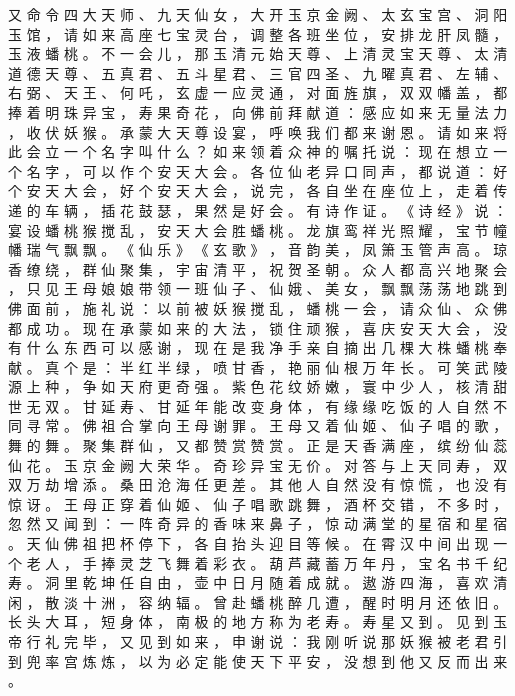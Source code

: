 {又 命 令 四 大 天 师 、 九 天 仙 女 ， 大 开 玉 京 金 阙 、 太 玄 宝 宫 、 洞 阳 玉 馆 ， 请 如 来 高 座 七 宝 灵 台 ， 调 整 各 班 坐 位 ， 安 排 龙 肝 凤 髓 ， 玉 液 蟠 桃 。
不 一 会 儿 ， 那 玉 清 元 始 天 尊 、 上 清 灵 宝 天 尊 、 太 清 道 德 天 尊 、 五 真 君 、 五 斗 星 君 、 三 官 四 圣 、 九 曜 真 君 、 左 辅 、 右 弼 、 天 王 、 何 吒 ， 玄 虚 一 应 灵 通 ， 对 面 旌 旗 ， 双 双 幡 盖 ， 都 捧 着 明 珠 异 宝 ， 寿 果 奇 花 ， 向 佛 前 拜 献 道 ： 感 应 如 来 无 量 法 力 ， 收 伏 妖 猴 。
承 蒙 大 天 尊 设 宴 ， 呼 唤 我 们 都 来 谢 恩 。
请 如 来 将 此 会 立 一 个 名 字 叫 什 么 ？ 如 来 领 着 众 神 的 嘱 托 说 ： 现 在 想 立 一 个 名 字 ， 可 以 作 个 安 天 大 会 。
各 位 仙 老 异 口 同 声 ， 都 说 道 ： 好 个 安 天 大 会 ， 好 个 安 天 大 会 ， 说 完 ， 各 自 坐 在 座 位 上 ， 走 着 传 递 的 车 辆 ， 插 花 鼓 瑟 ， 果 然 是 好 会 。
有 诗 作 证 。
《 诗 经 》 说 ： 宴 设 蟠 桃 猴 搅 乱 ， 安 天 大 会 胜 蟠 桃 。
龙 旗 鸾 祥 光 照 耀 ， 宝 节 幢 幡 瑞 气 飘 飘 。
《 仙 乐 》 《 玄 歌 》 ， 音 韵 美 ， 凤 箫 玉 管 声 高 。
琼 香 缭 绕 ， 群 仙 聚 集 ， 宇 宙 清 平 ， 祝 贺 圣 朝 。
众 人 都 高 兴 地 聚 会 ， 只 见 王 母 娘 娘 带 领 一 班 仙 子 、 仙 娥 、 美 女 ， 飘 飘 荡 荡 地 跳 到 佛 面 前 ， 施 礼 说 ： 以 前 被 妖 猴 搅 乱 ， 蟠 桃 一 会 ， 请 众 仙 、 众 佛 都 成 功 。
现 在 承 蒙 如 来 的 大 法 ， 锁 住 顽 猴 ， 喜 庆 安 天 大 会 ， 没 有 什 么 东 西 可 以 感 谢 ， 现 在 是 我 净 手 亲 自 摘 出 几 棵 大 株 蟠 桃 奉 献 。
真 个 是 ： 半 红 半 绿 ， 喷 甘 香 ， 艳 丽 仙 根 万 年 长 。
可 笑 武 陵 源 上 种 ， 争 如 天 府 更 奇 强 。
紫 色 花 纹 娇 嫩 ， 寰 中 少 人 ， 核 清 甜 世 无 双 。
甘 延 寿 、 甘 延 年 能 改 变 身 体 ， 有 缘 缘 吃 饭 的 人 自 然 不 同 寻 常 。
佛 祖 合 掌 向 王 母 谢 罪 。
王 母 又 着 仙 姬 、 仙 子 唱 的 歌 ， 舞 的 舞 。
聚 集 群 仙 ， 又 都 赞 赏 赞 赏 。
正 是 天 香 满 座 ， 缤 纷 仙 蕊 仙 花 。
玉 京 金 阙 大 荣 华 。
奇 珍 异 宝 无 价 。
对 答 与 上 天 同 寿 ， 双 双 万 劫 增 添 。
桑 田 沧 海 任 更 差 。
其 他 人 自 然 没 有 惊 慌 ， 也 没 有 惊 讶 。
王 母 正 穿 着 仙 姬 、 仙 子 唱 歌 跳 舞 ， 酒 杯 交 错 ， 不 多 时 ， 忽 然 又 闻 到 ： 一 阵 奇 异 的 香 味 来 鼻 子 ， 惊 动 满 堂 的 星 宿 和 星 宿 。
天 仙 佛 祖 把 杯 停 下 ， 各 自 抬 头 迎 目 等 候 。
在 霄 汉 中 间 出 现 一 个 老 人 ， 手 捧 灵 芝 飞 舞 着 彩 衣 。
葫 芦 藏 蓄 万 年 丹 ， 宝 名 书 千 纪 寿 。
洞 里 乾 坤 任 自 由 ， 壶 中 日 月 随 着 成 就 。
遨 游 四 海 ， 喜 欢 清 闲 ， 散 淡 十 洲 ， 容 纳 辐 。
曾 赴 蟠 桃 醉 几 遭 ， 醒 时 明 月 还 依 旧 。
长 头 大 耳 ， 短 身 体 ， 南 极 的 地 方 称 为 老 寿 。
寿 星 又 到 。
见 到 玉 帝 行 礼 完 毕 ， 又 见 到 如 来 ， 申 谢 说 ： 我 刚 听 说 那 妖 猴 被 老 君 引 到 兜 率 宫 炼 炼 ， 以 为 必 定 能 使 天 下 平 安 ， 没 想 到 他 又 反 而 出 来 。
}
